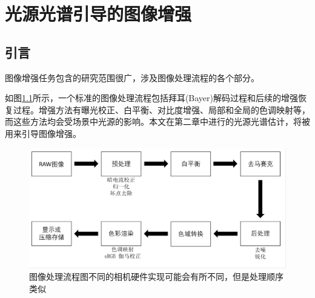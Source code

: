\documentclass[
    type = master, %
    degree = academic,        %
    decl-page,  %
  ]{njuthesis}
\begin{document}
\chapter{光源光谱引导的图像增强}

\section{引言}
图像增强任务包含的研究范围很广，涉及图像处理流程的各个部分。

如图\ref{fig:isp}所示，一个标准的图像处理流程\cite{J19}包括拜耳(Bayer)解码过程和后续的增强恢复过程。增强方法有曝光校正\cite{J37}、白平衡\cite{J12}、对比度增强\cite{J4}、局部和全局的色调映射\cite{J27}等，而这些方法均会受场景中光源的影响。本文在第二章中进行的光源光谱估计，将被用来引导图像增强。

\begin{figure}[h]
	\centering
	\includegraphics[width=1.0\linewidth]{docs/fig-chap3/fig-3-isp.pdf}
	\caption{图像处理流程图\quad 不同的相机硬件实现可能会有所不同，但是处理顺序类似}
	\label{fig:isp}
\end{figure}
\end{document}
